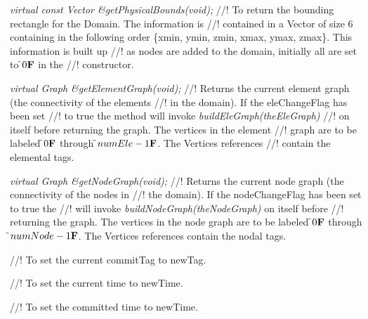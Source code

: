 {\em virtual const Vector \&getPhysicalBounds(void);} 
//! To return the bounding rectangle for the Domain. The information is
//! contained in a Vector of size 6 containing in the following order
\{xmin, ymin, zmin, xmax, ymax, zmax\}. This information is built up
//! as nodes are added to the domain, initially all are set to \f$0{\bf F}$ in the
//! constructor. 

{\em virtual Graph \&getElementGraph(void);} 
//! Returns the current element graph (the connectivity of the elements
//! in the domain). If the \p eleChangeFlag has been set
//! to \p true the method will invoke {\em buildEleGraph(theEleGraph)}
//! on itself before returning the graph. The vertices in the element
//! graph are to be labeled \f$0{\bf F}$ through \f$numEle-1{\bf F}$. The Vertices references
//! contain the elemental tags.  

{\em virtual Graph \&getNodeGraph(void);} 
//! Returns the current node graph (the connectivity of the nodes in
//! the domain). If the \p nodeChangeFlag has been set to \p true the
//! will invoke {\em buildNodeGraph(theNodeGraph)} on itself before
//! returning the graph. The vertices in the node graph are to be labeled
\f$0{\bf F}$ through \f$numNode-1{\bf F}$. The Vertices references contain the nodal tags.  


//! To set the current commitTag to \p newTag. 

//! To set the current time to \p newTime. 

//! To set the committed time to \p newTime. 

